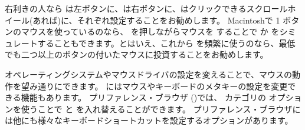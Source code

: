 \documentclass[a4paper,10pt,twoside]{book}
\begin{document}





右利きの人なら \click は左ボタンに、\actclick は右ボタンに、\metaclick はクリックできるスクロールホイール(あれば)に、それぞれ設定することをお勧めします。
Macintoshで 1 ボタンのマウスを使っているのなら、\clover{} を押しながらマウスを \click することで \actclick か \metaclick をシミュレートすることもできます。とはいえ、これから \pharo を頻繁に使うのなら、最低でも二つ以上のボタンの付いたマウスに投資することをお勧めします。

オペレーティングシステムやマウスドライバの設定を変えることで、マウスの動作を望み通りにできます。
\pharo にはマウスやキーボードのメタキーの設定を変更できる機能もあります。
プリファレンス・ブラウザ ()では、 カテゴリの  オプションを使うことで \actclick と \metaclick を入れ替えることができます。
プリファレンス・ブラウザには他にも様々なキーボードショートカットを設定するオプションがあります。
\end{document}

